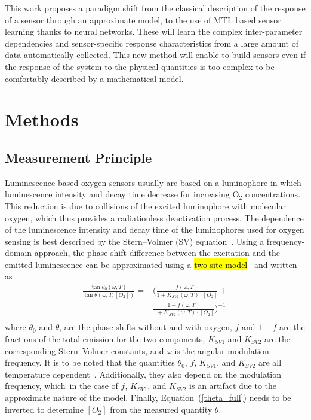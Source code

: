 \documentclass[sensors,article,accept,moreauthors,pdftex,10pt,a4paper]{Definitions/mdpi}
\begin{document}
This work proposes a paradigm shift from the classical description of the response of a sensor through an approximate model, to the use of MTL based sensor learning thanks to neural networks. 
These will learn the complex inter-parameter dependencies and sensor-specific response characteristics from a large amount of data automatically collected. This new method will enable to build sensors even if the response of the system to the physical quantities is too complex to be comfortably described by a mathematical model.


\section{Methods}
\label{sec:methods}
\vspace{-6pt}

\subsection{Measurement Principle}
\label{Theory}

Luminescence-based oxygen sensors usually are based on a luminophore in which luminescence intensity and decay time decrease for increasing O$_2$ concentrations. This reduction is due to collisions of the excited luminophore with molecular oxygen, which thus provides a radiationless deactivation process. The dependence of the luminescence intensity and decay time of the luminophores used for oxygen sensing is best described by the Stern--Volmer (SV) equation~\cite{Lakowicz2006}. Using a frequency-domain approach, the phase shift difference between the excitation and the emitted luminescence can be approximated using a \hl{two-site model}~\cite{Carraway1991,Demas1995} and written as~\cite{Michelucci2019} %
\begin{equation}
\begin{aligned}
\frac{\tan \theta_0 (\omega, T)}{\tan \theta (\omega, T, [O_2])}=
 & \bigg( \frac{f (\omega , T) }{1+K_{SV1} (\omega , T) \cdot \left[O_2\right]}+ \\
&\frac{1-f (\omega , T) }{1+K_{SV2} (\omega , T) \cdot \left[O_2\right]} \bigg)^{-1} \\
\label{theta_full}
\end{aligned}
\end{equation}
where $\theta_0$ and $\theta$, are the phase shifts without and with oxygen, $f$ and $1-f$ are the fractions of the total emission for the two components, $K_{SV1}$ and $K_{SV2}$ are the corresponding Stern–Volmer constants, and $\omega$ is the angular modulation frequency. It is to be noted that the quantities $\theta_0$, $f$, $K_{SV1}$, and $K_{SV2}$ are all temperature dependent~\cite{Ogurtsov2006,lo2008,Zaitsev2016}. Additionally, they also depend on the modulation frequency, which~in the case of $f$, $K_{SV1}$, and $K_{SV2}$ is an artifact due to the approximate nature of the model. Finally, Equation~(\ref{theta_full}) needs to be inverted to determine $[O_2]$ from the measured quantity $\theta$.
\end{document}
